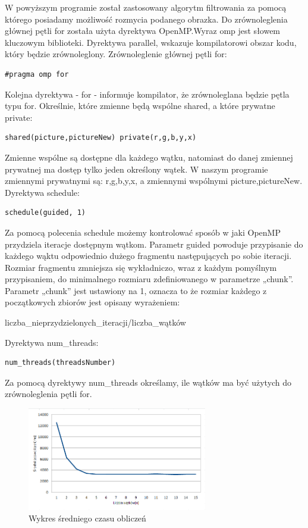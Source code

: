 \documentclass[a4paper,10pt]{article}
\begin{document}
W powyższym programie został zastosowany algorytm filtrowania za pomocą którego posiadamy możliwość rozmycia podanego obrazka. Do zrównoleglenia głównej pętli for została użyta dyrektywa OpenMP.Wyraz omp jest słowem kluczowym biblioteki. Dyrektywa parallel, wskazuje kompilatorowi obszar kodu,
który  będzie  zrównoleglony.
\newline
\newline
Zrównoleglenie głównej pętli for: 
\begin{lstlisting}
#pragma omp for
\end{lstlisting}
 Kolejna dyrektywa - for - informuje kompilator, że zrównoleglana będzie pętla typu for.
\newline
\newline
Określnie, które zmienne będą wspólne shared, a które prywatne private:
\begin{lstlisting}
shared(picture,pictureNew) private(r,g,b,y,x) 
\end{lstlisting}
Zmienne wspólne są dostępne dla każdego wątku, natomiast do danej zmiennej prywatnej ma dostęp tylko jeden określony wątek. W naszym programie zmiennymi prywatnymi są: r,g,b,y,x, a zmiennymi wspólnymi picture,pictureNew.
\newline
\newline
Dyrektywa schedule: 
\begin{lstlisting}
schedule(guided, 1)
\end{lstlisting}
Za pomocą polecenia schedule możemy kontrolować sposób w jaki OpenMP przydziela iteracje dostępnym wątkom. Parametr guided powoduje przypisanie do każdego wąktu odpowiednio dużego fragmentu następujących po sobie iteracji. Rozmiar fragmentu zmniejsza się wykładniczo, wraz z każdym pomyślnym przypisaniem, do minimalnego rozmiaru zdefiniowanego w parametrze „chunk”. Parametr „chunk” jest ustawiony na 1, oznacza to że rozmiar każdego z początkowych zbiorów jest opisany wyrażeniem:
\begin{center}liczba\_nieprzydzielonych\_iteracji/liczba\_wątków
\end{center}
Dyrektywa num\_threads: 
\begin{lstlisting}
num_threads(threadsNumber)
\end{lstlisting}
Za pomocą dyrektywy num\_threads określamy, ile wątków ma być użytych do zrównoleglenia pętli for.
\newline
\newline

\begin{figure}[!ht]
	\centering
 \includegraphics[width=0.7\textwidth]{1.png}
  \caption{Wykres średniego czasu obliczeń}
\end{figure}
\end{document}
